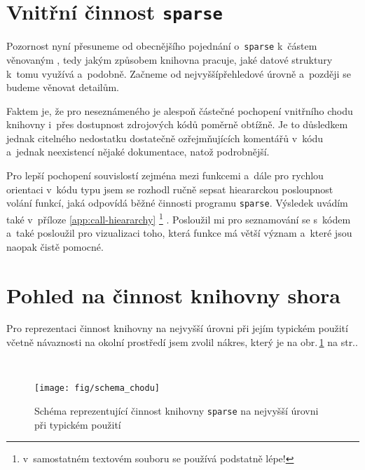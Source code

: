 \section{Vnitřní činnost \texttt{sparse}}

Pozornost nyní přesuneme od obecnějšího pojednání o~\texttt{sparse}
k~částem věnovaným , tedy jakým způsobem knihovna pracuje,
jaké datové struktury k~tomu využívá a~podobně. Začneme od nejvyšší\ndash{}přehledové
úrovně a~později se budeme věnovat detailům.

Faktem je, že pro neseznámeného je alespoň částečné pochopení vnitřního
chodu knihovny i~přes dostupnost zdrojových kódů poměrně obtížně.
Je to důsledkem jednak citelného nedostatku dostatečně
ozřejmňujících komentářů v~kódu a~jednak neexistencí nějaké
dokumentace, natož podrobnější.

Pro lepší pochopení souvislostí
zejména mezi funkcemi a~dále pro rychlou orientaci v~kódu typu
 jsem se rozhodl ručně sepsat hieararckou posloupnost
volání funkcí, jaká odpovídá běžné činnosti programu \texttt{sparse}.
Výsledek uvádím také v~příloze \ref{app:call-hieararchy}%
%
\footnote{v~samostatném textovém souboru se používá podstatně lépe!}%
%
.
Posloužil mi pro seznamování se s~kódem a~také posloužil
pro vizualizaci toho, která funkce má větší význam a~které jsou
naopak čistě pomocné.

\section{Pohled na činnost knihovny shora}

Pro reprezentaci činnost knihovny na nejvyšší úrovni
při jejím typickém použití včetně návaznosti na okolní
prostředí jsem zvolil nákres, který je na obr.\,\ref{fig:chod} na str.\pageref{fig:chod}.

\hspace*{\fill}\\[-\baselineskip]
\begin{figure}[!h]
    \begin{center}
        \texttt{[image: fig/schema\_chodu]}
        \label{fig:chod}
        \caption{Schéma reprezentující činnost knihovny \texttt{sparse} na nejvyšší úrovni
                 při typickém použití}
    \end{center}
\end{figure}

